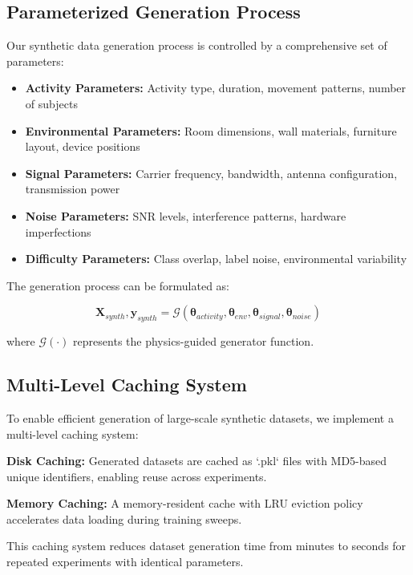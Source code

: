 \documentclass[journal]{IEEEtran}
\begin{document}
\subsection{Parameterized Generation Process}

Our synthetic data generation process is controlled by a comprehensive set of parameters:

\begin{itemize}
\item \textbf{Activity Parameters:} Activity type, duration, movement patterns, number of subjects
\item \textbf{Environmental Parameters:} Room dimensions, wall materials, furniture layout, device positions
\item \textbf{Signal Parameters:} Carrier frequency, bandwidth, antenna configuration, transmission power
\item \textbf{Noise Parameters:} SNR levels, interference patterns, hardware imperfections
\item \textbf{Difficulty Parameters:} Class overlap, label noise, environmental variability
\end{itemize}

The generation process can be formulated as:

\begin{equation}
\mathbf{X}_{synth}, \mathbf{y}_{synth} = \mathcal{G}(\boldsymbol{\theta}_{activity}, \boldsymbol{\theta}_{env}, \boldsymbol{\theta}_{signal}, \boldsymbol{\theta}_{noise})
\end{equation}

where $\mathcal{G}(\cdot)$ represents the physics-guided generator function.

\subsection{Multi-Level Caching System}

To enable efficient generation of large-scale synthetic datasets, we implement a multi-level caching system:

\textbf{Disk Caching:} Generated datasets are cached as `.pkl` files with MD5-based unique identifiers, enabling reuse across experiments.

\textbf{Memory Caching:} A memory-resident cache with LRU eviction policy accelerates data loading during training sweeps.

This caching system reduces dataset generation time from minutes to seconds for repeated experiments with identical parameters.
\end{document}
